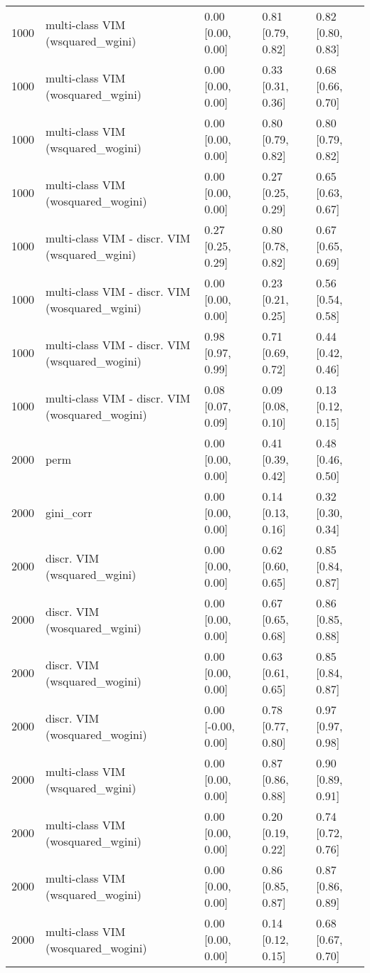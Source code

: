 \begin{table}[ht]
\begin{tabular}{rllll}
  1000 & multi-class VIM (wsquared\_wgini) & 0.00 [0.00, 0.00] & 0.81 [0.79, 0.82] & 0.82 [0.80, 0.83] \\ 
  1000 & multi-class VIM (wosquared\_wgini) & 0.00 [0.00, 0.00] & 0.33 [0.31, 0.36] & 0.68 [0.66, 0.70] \\ 
  1000 & multi-class VIM (wsquared\_wogini) & 0.00 [0.00, 0.00] & 0.80 [0.79, 0.82] & 0.80 [0.79, 0.82] \\ 
  1000 & multi-class VIM (wosquared\_wogini) & 0.00 [0.00, 0.00] & 0.27 [0.25, 0.29] & 0.65 [0.63, 0.67] \\ 
  1000 & multi-class VIM - discr. VIM (wsquared\_wgini) & 0.27 [0.25, 0.29] & 0.80 [0.78, 0.82] & 0.67 [0.65, 0.69] \\ 
  1000 & multi-class VIM - discr. VIM (wosquared\_wgini) & 0.00 [0.00, 0.00] & 0.23 [0.21, 0.25] & 0.56 [0.54, 0.58] \\ 
  1000 & multi-class VIM - discr. VIM (wsquared\_wogini) & 0.98 [0.97, 0.99] & 0.71 [0.69, 0.72] & 0.44 [0.42, 0.46] \\ 
  1000 & multi-class VIM - discr. VIM (wosquared\_wogini) & 0.08 [0.07, 0.09] & 0.09 [0.08, 0.10] & 0.13 [0.12, 0.15] \\ 
   \hline 2000 & perm & 0.00 [0.00, 0.00] & 0.41 [0.39, 0.42] & 0.48 [0.46, 0.50] \\ 
  2000 & gini\_corr & 0.00 [0.00, 0.00] & 0.14 [0.13, 0.16] & 0.32 [0.30, 0.34] \\ 
  2000 & discr. VIM (wsquared\_wgini) & 0.00 [0.00, 0.00] & 0.62 [0.60, 0.65] & 0.85 [0.84, 0.87] \\ 
  2000 & discr. VIM (wosquared\_wgini) & 0.00 [0.00, 0.00] & 0.67 [0.65, 0.68] & 0.86 [0.85, 0.88] \\ 
  2000 & discr. VIM (wsquared\_wogini) & 0.00 [0.00, 0.00] & 0.63 [0.61, 0.65] & 0.85 [0.84, 0.87] \\ 
  2000 & discr. VIM (wosquared\_wogini) & 0.00 [-0.00, 0.00] & 0.78 [0.77, 0.80] & 0.97 [0.97, 0.98] \\ 
  2000 & multi-class VIM (wsquared\_wgini) & 0.00 [0.00, 0.00] & 0.87 [0.86, 0.88] & 0.90 [0.89, 0.91] \\ 
  2000 & multi-class VIM (wosquared\_wgini) & 0.00 [0.00, 0.00] & 0.20 [0.19, 0.22] & 0.74 [0.72, 0.76] \\ 
  2000 & multi-class VIM (wsquared\_wogini) & 0.00 [0.00, 0.00] & 0.86 [0.85, 0.87] & 0.87 [0.86, 0.89] \\ 
  2000 & multi-class VIM (wosquared\_wogini) & 0.00 [0.00, 0.00] & 0.14 [0.12, 0.15] & 0.68 [0.67, 0.70] \\ 

\end{tabular}
\end{table}
